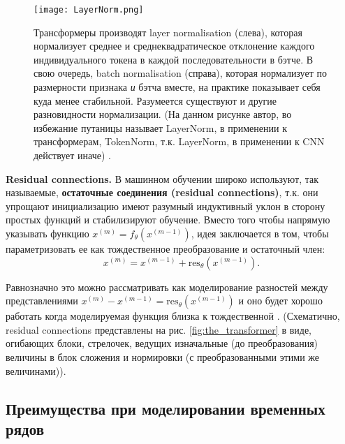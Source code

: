 \begin{figure}[h!]
    \centering
    \texttt{[image: LayerNorm.png]}
    \caption{Трансформеры производят layer normalisation (слева), которая 
    нормализует среднее и среднеквадратическое отклонение каждого 
    индивидуального токена в каждой последовательности в бэтче. В 
    свою очередь, batch normalisation (справа), которая нормализует по 
    размерности признака \textit{и} бэтча вместе, на практике показывает себя 
    куда менее стабильной. Разумеется существуют и другие разновидности нормализации. 
    (На данном рисунке автор, во избежание путаницы называет 
    LayerNorm, в применении к трансформерам, TokenNorm, т.к. LayerNorm, 
    в применении к CNN действует иначе) \cite{turner_transformers_intro}.}
    \label{fig:LayerNorm}
\end{figure}

\textbf{Residual connections. \quad}
В машинном обучении широко используют, так называемые, \textbf{остаточные соединения 
(residual connections)}, т.к. они упрощают инициализацию имеют разумный индуктивный 
уклон в сторону простых функций и стабилизируют обучение. Вместо того чтобы напрямую 
указывать функцию $x^{(m)} = f_\theta (x^{(m-1)})$, идея заключается в том, чтобы 
параметризовать ее как тождественное преобразование и остаточный член:
\begin{equation*}
    x^{(m)} = x^{(m-1)} + \text{res}_\theta (x^{(m-1)}).
\end{equation*}

Равнозначно это можно рассматривать как моделирование разностей между 
представлениями $x^{(m)} - x^{(m-1)} = \text{res}_\theta (x^{(m-1)})$ 
и оно будет хорошо работать когда моделируемая функция близка к тождественной 
\cite{turner_transformers_intro}. (Схематично, residual connections представлены 
на рис. \ref{fig:the_transformer} в виде, огибающих блоки, стрелочек, 
ведущих изначальные (до преобразования) величины в блок сложения и нормировки 
(с преобразованными этими же величинами)).

\subsection{Преимущества при моделировании временных рядов}

